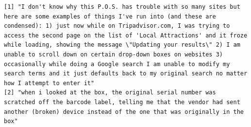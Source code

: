 \begin{Shaded}
\begin{Highlighting}[]


\OtherTok{\textless{}{-}}\SpecialCharTok{\%\textgreater{}\%} 
  \SpecialCharTok{==} \NormalTok{)}

\OtherTok{\textless{}{-}}\SpecialCharTok{\%\textgreater{}\%} 
  \SpecialCharTok{==} \NormalTok{)}

\OtherTok{\textless{}{-}} \SpecialCharTok{$} \NormalTok{)  }
\OtherTok{\textless{}{-}} \SpecialCharTok{$} \NormalTok{)}


\end{Highlighting}
\end{Shaded}

\begin{verbatim}
[1] "I don't know why this P.O.S. has trouble with so many sites but here are some examples of things I've run into (and these are condensed): 1) just now while on Tripadvisor.com, I was trying to access the second page on the list of 'Local Attractions' and it froze while loading, showing the message \"Updating your results\" 2) I am unable to scroll down on certain drop-down boxes on websites 3) occasionally while doing a Google search I am unable to modify my search terms and it just defaults back to my original search no matter how I attempt to enter it"
[2] "when i looked at the box, the original serial number was scratched off the barcode label, telling me that the vendor had sent another (broken) device instead of the one that was originally in the box"                                                                                                                                                                                                                                                                                                                                                                       
\end{verbatim}


